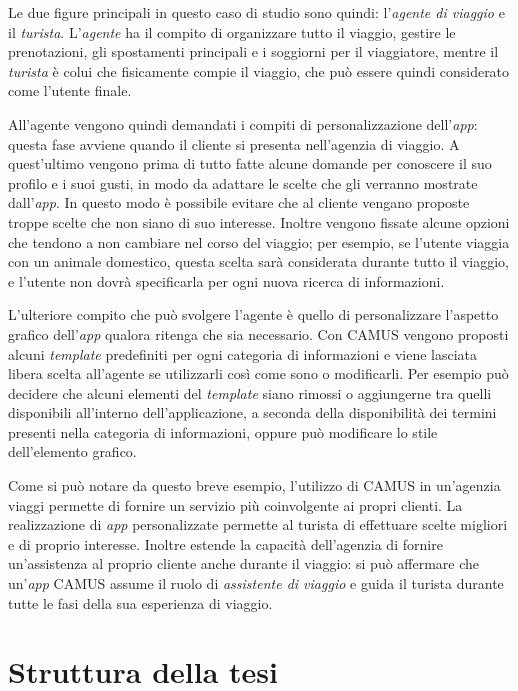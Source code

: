 Le due figure principali in questo caso di studio sono quindi: l'\emph{agente di viaggio} e il \emph{turista}. L'\emph{agente} ha il compito di organizzare tutto il viaggio, gestire le prenotazioni, gli spostamenti principali e i soggiorni per il viaggiatore, mentre il \emph{turista} è colui che fisicamente compie il viaggio, che può essere quindi considerato come l'utente finale.

All'agente vengono quindi demandati i compiti di personalizzazione dell'\emph{app}: questa fase avviene quando il cliente si presenta nell'agenzia di viaggio. A quest'ultimo vengono prima di tutto fatte alcune domande per conoscere il suo profilo e i suoi gusti, in modo da adattare le scelte che gli verranno mostrate dall'\emph{app}. In questo modo è possibile evitare che al cliente vengano proposte troppe scelte che non siano di suo interesse. Inoltre vengono fissate alcune opzioni che tendono a non cambiare nel corso del viaggio; per esempio, se l'utente viaggia con un animale domestico, questa scelta sarà considerata durante tutto il viaggio, e l'utente non dovrà specificarla per ogni nuova ricerca di informazioni. %

L'ulteriore compito che può svolgere l'agente è quello di personalizzare l'aspetto grafico dell'\emph{app} qualora ritenga che sia necessario. Con CAMUS vengono proposti alcuni \emph{template} predefiniti per ogni categoria di informazioni e viene lasciata libera scelta all'agente se utilizzarli così come sono o modificarli. Per esempio può decidere che alcuni elementi del \emph{template} siano rimossi o aggiungerne tra quelli disponibili all'interno dell'applicazione, a seconda della disponibilità dei termini presenti nella categoria di informazioni, oppure può modificare lo stile dell'elemento grafico.

Come si può notare da questo breve esempio, l'utilizzo di CAMUS in un'agenzia viaggi permette di fornire un servizio più coinvolgente ai propri clienti. La realizzazione di \emph{app} personalizzate permette al turista di effettuare scelte migliori e di proprio interesse. Inoltre estende la capacità dell'agenzia di fornire un'assistenza al proprio cliente anche durante il viaggio: si può affermare che un'\emph{app} CAMUS assume il ruolo di \emph{assistente di viaggio} e guida il turista durante tutte le fasi della sua esperienza di viaggio.

\clearpage

\section{Struttura della tesi}

